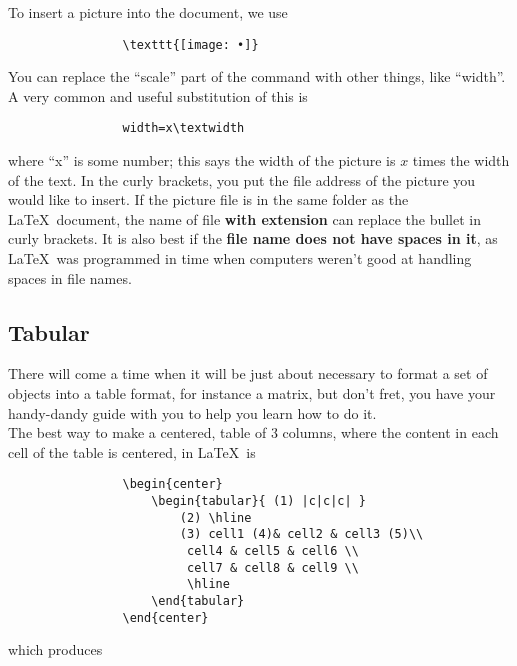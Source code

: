 \documentclass[11pt,letterpaper,twoside,titlepage]{article}
\newcommand{\latex}{\LaTeX \ }
\begin{document}
			To insert a picture into the document, we use
			
			\begin{verbatim}
				\texttt{[image: •]}
			\end{verbatim}
			
			You can replace the ``scale'' part of the command with other things, like ``width''.  A very common and useful substitution of this is 
			
			\begin{verbatim}
				width=x\textwidth
			\end{verbatim}
			
			where ``x'' is some number; this says the width of the picture is $x$ times the width of the text.  In the curly brackets, you put the file address of the picture you would like to insert.  If the picture file is in the same folder as the \latex document, the name of file \textbf{with extension} can replace the bullet in curly brackets.  It is also best if the \textbf{file name does not have spaces in it}, as \latex was programmed in time when computers weren't good at handling spaces in file names.
			
		\subsection{Tabular}
		
			There will come a time when it will be just about necessary to format a set of objects into a table format, for instance a matrix, but don't fret, you have your handy-dandy guide with you to help you learn how to do it. \\
			
			The best way to make a centered, table of 3 columns, where the content in each cell of the table is centered, in \latex is 
			
			\begin{verbatim}
				\begin{center}
					\begin{tabular}{ (1) |c|c|c| } 
						(2) \hline
						(3) cell1 (4)& cell2 & cell3 (5)\\ 
						 cell4 & cell5 & cell6 \\ 
						 cell7 & cell8 & cell9 \\ 
						 \hline
					\end{tabular}
				\end{center}
			\end{verbatim}
			
			which produces
			
\end{document}

